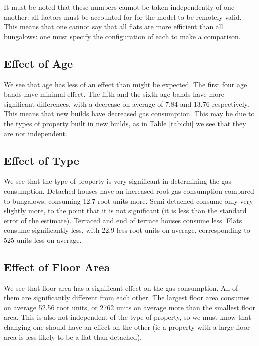 \documentclass[]{extarticle}
\begin{document}
It must be noted that these numbers cannot be taken independently of one another: all factors must be accounted for for the model to be remotely valid. This means that one cannot say that all flats are more efficient than all bungalows: one must specify the configuration of each to make a comparison.

\subsection{Effect of Age}
We see that age has less of an effect than might be expected. The first four age bands have minimal effect. The fifth and the sixth age bands have more significant differences, with a decrease on average of 7.84 and 13.76 respectively. This means that new builds have decreased gas consumption. This may be due to the types of property built in new builds, as in Table \ref{tab:chi} we see that they are not independent.

\subsection{Effect of Type}
We see that the type of property is very significant in determining the gas consumption. Detached houses have an increased root gas consumption compared to bungalows, consuming 12.7 root units more. Semi detached consume only very slightly more, to the point that it is not significant (it is less than the standard error of the estimate). Terraced and end of terrace houses consume less. Flats consume significantly less, with 22.9 less root units on average, corresponding to 525 units less on average. 

\subsection{Effect of Floor Area}
We see that floor area has a significant effect on the gas consumption. All of them are significantly different from each other. The largest floor area consumes on average 52.56 root units, or 2762 units on average more than the smallest floor area. This is also not independent of the type of property, so we must know that changing one should have an effect on the other (ie a property with a large floor area is less likely to be a flat than detached).
\end{document}

